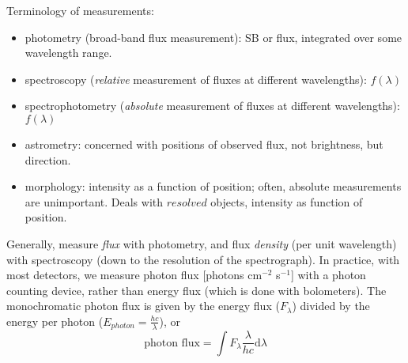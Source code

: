 \documentclass[12pt]{article}
\begin{document}
\noindent Terminology of measurements:
\begin{itemize}
    \item photometry (broad-band flux measurement): SB or flux, integrated
        over some wavelength range.
    \item spectroscopy (\emph{relative} measurement of fluxes at
        different wavelengths):
        $f(\lambda)$
    \item spectrophotometry (\emph{absolute} measurement of fluxes at
        different wavelengths):
        $f(\lambda)$
    \item astrometry: concerned with positions of observed flux, not brightness,
        but direction.
    \item morphology: intensity as a function of position;
        often, absolute measurements are unimportant. Deals with $resolved$
        objects, intensity as function of position.
\end{itemize}
Generally, measure \emph{flux} with photometry, and flux
\emph{density} (per unit wavelength)  with spectroscopy
(down to the resolution of the spectrograph).
In practice, with most detectors,
we measure photon flux [photons cm$^{-2}$ s$^{-1}$]
with a photon counting device,
rather than energy flux (which is done with bolometers).
The monochromatic photon flux is given by the
energy flux ($F_{\lambda}$)
divided by the
energy per photon ($E_{photon} = \frac{hc}{\lambda}$), or
\begin{equation*}
    \textrm{photon\ flux} = \int F_{\lambda}
    \frac{\lambda}{hc} \textrm{d} \lambda
\end{equation*}


\end{document}

